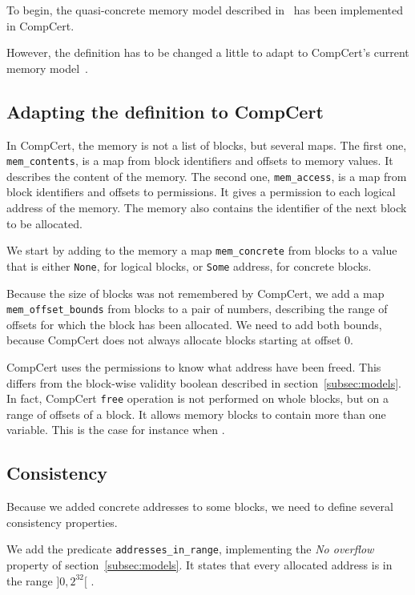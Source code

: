 \label{sec:memupdate}
To begin, the quasi-concrete memory model described in~\cite{DBLP:conf/pldi/KangHMGZV15} has been implemented in CompCert. 

However, the definition has to be changed a little to adapt to CompCert's current memory model~\cite{leroy:hal-00703441}.

\subsection{Adapting the definition to CompCert}
In CompCert, the memory is not a list of blocks, but several maps.
The first one, \texttt{mem\_contents}, is a map from block identifiers and offsets to memory values. It describes the content of the memory.
The second one, \texttt{mem\_access}, is a map from block identifiers and offsets to permissions. It gives a permission to each logical address of the memory.
The memory also contains the identifier of the next block to be allocated.

We start by adding to the memory a map \texttt{mem\_concrete} from blocks to a value that is either \texttt{None}, for logical blocks, or \texttt{Some} address, for concrete blocks.

Because the size of blocks was not remembered by CompCert, we add a map \texttt{mem\_offset\_bounds} from blocks to a pair of numbers, describing the range of offsets for which the block has been allocated. We need to add both bounds, because CompCert does not always allocate blocks starting at offset 0. 

CompCert uses the permissions to know what address have been freed. This differs from the block-wise validity boolean described in section~\ref{subsec:models}.
In fact, CompCert \texttt{free} operation is not performed on whole blocks, but on a range of offsets of a block. It allows memory blocks to contain more than one variable. This is the case for instance when .

\subsection{Consistency}
Because we added concrete addresses to some blocks, we need to define several consistency properties.

We add the predicate \texttt{addresses\_in\_range}, implementing the \textit{No overflow} property of section~\ref{subsec:models}. It states that every allocated address is in the range $]0,2^{32}[$ .

